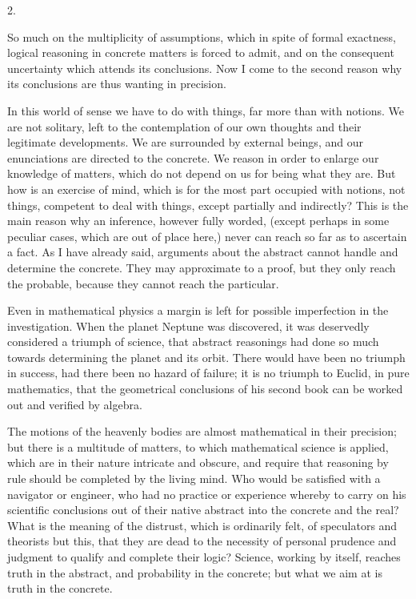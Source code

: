 2.

So much on the multiplicity of assumptions, which in spite of
formal exactness, logical reasoning in concrete matters is forced to
admit, and on the consequent uncertainty which attends its
conclusions. Now I come to the second reason why its conclusions are
thus wanting in precision.

In this world of sense we have to do with things, far more than
with notions. We are not solitary, left to the contemplation of our
own thoughts and their legitimate developments. We are surrounded by
external beings, and our enunciations are directed to the concrete. We
reason in order to enlarge our knowledge of matters, which do
not depend on us for being what they are. But how is an exercise of
mind, which is for the most part occupied with notions, not things,
competent to deal with things, except partially and indirectly? This
is the main reason why an inference, however fully worded, (except
perhaps in some peculiar cases, which are out of place here,) never
can reach so far as to ascertain a fact. As I have already said,
arguments about the abstract cannot handle and determine the concrete.
They may approximate to a proof, but they only reach the probable,
because they cannot reach the particular.

Even in mathematical physics a margin is left for possible
imperfection in the investigation. When the planet Neptune was
discovered, it was deservedly considered a triumph of science, that
abstract reasonings had done so much towards determining the planet
and its orbit. There would have been no triumph in success, had there
been no hazard of failure; it is no triumph to Euclid, in pure
mathematics, that the geometrical conclusions of his second book can
be worked out and verified by algebra.

The motions of the heavenly bodies are almost mathematical in their
precision; but there is a multitude of matters, to which mathematical
science is applied, which are in their nature intricate and obscure,
and require that reasoning by rule should be completed by the living
mind. Who would be satisfied with a navigator or engineer, who had no
practice or experience whereby to carry on his scientific conclusions
out of their native abstract into the concrete and the real? What is
the meaning of the distrust, which is ordinarily felt, of speculators and theorists but this, that they are dead to the
necessity of personal prudence and judgment to qualify and complete
their logic? Science, working by itself, reaches truth in the
abstract, and probability in the concrete; but what we aim at is truth
in the concrete.

